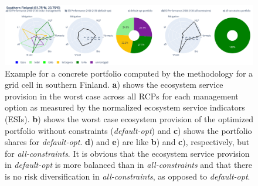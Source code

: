 \documentclass[]{article}
\begin{document}
\begin{figure}[h!]
	\centering
	\includegraphics[width=\linewidth]{paper_figs/es_provision.png}
	\caption{Example for a concrete portfolio computed by the methodology for a grid cell in southern Finland. \textbf{a}) shows the ecosystem service provision in the worst case across all RCPs for each management option as measured by the normalized ecosystem service indicators (ESIs). \textbf{b}) shows the worst case ecosystem provision of the optimized portfolio without constraints (\textit{default-opt}) and \textbf{c}) shows the portfolio shares for \textit{default-opt}. \textbf{d}) and \textbf{e}) are like \textbf{b}) and \textbf{c}), respectively, but for \textit{all-constraints}. It is obvious that the ecosystem service provision in \textit{default-opt} is more balanced than in \textit{all-constraints} and that there is no risk diversification in \textit{all-constraints}, as opposed to \textit{default-opt}.}
	\label{fig:es-provision}
\end{figure}
\end{document}
